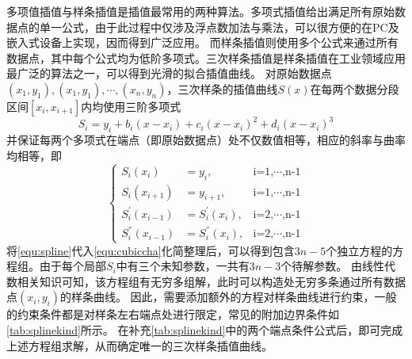 多项值插值与样条插值是插值最常用的两种算法\cite{Timothy2018,Carl2008}。多项式插值给出满足所有原始数据点的单一公式，由于此过程中仅涉及浮点数加法与乘法，可以很方便的在PC及嵌入式设备上实现，因而得到广泛应用。
而样条插值则使用多个公式来通过所有数据点，其中每个公式均为低阶多项式。三次样条插值是样条插值在工业领域应用最广泛的算法之一，可以得到光滑的拟合插值曲线。
对原始数据点$(x_1,y_1),(x_1,y_1),\cdots,(x_n,y_n)$，三次样条的插值曲线$S(x)$在每两个数据分段区间$[x_i,x_{i+1}]$内均使用三阶多项式
\begin{equation}
    \label{equ:spline}
    S_{i}=y_{i}+b_{i}(x-x_{i})+c_{i}{(x-x_{i})}^2+d_{i}{(x-x_{i})}^3
\end{equation}
并保证每两个多项式在端点（即原始数据点）处不仅数值相等，相应的斜率与曲率均相等，即
\begin{equation}
    \label{equ:cubiccha}
    \left \{
    \begin{aligned}
        S_{i}(x_{i})&=y_i,&\text{i=1,$\cdots$,n-1}\\
        S_{i}(x_{i+1})&=y_{i+1},&\text{i=1,$\cdots$,n-1}\\
        S_{i}^{'}(x_{i-1})&=S_{i}^{'}(x_{i}),&\text{i=2,$\cdots$,n-1} \\
        S_{i}^{''}(x_{i-1})&=S_{i}^{''}(x_{i}),&\text{i=2,$\cdots$,n-1}
    \end{aligned}
    \right.
\end{equation}
将\autoref{equ:spline}代入\autoref{equ:cubiccha}化简整理后，可以得到包含$3n-5$个独立方程的方程组。由于每个局部$S_i$中有三个未知参数，一共有$3n-3$个待解参数。
由线性代数相关知识可知，该方程组有无穷多组解，此时可以构造处无穷多条通过所有数据点$(x_i,y_i)$的样条曲线。
因此，需要添加额外的方程对样条曲线进行约束，一般的约束条件都是对样条左右端点处进行限定，常见的附加边界条件如\autoref{tab:splinekind}所示\cite{Timothy2018}。
在补充\autoref{tab:splinekind}中的两个端点条件公式后，即可完成上述方程组求解，从而确定唯一的三次样条插值曲线。

